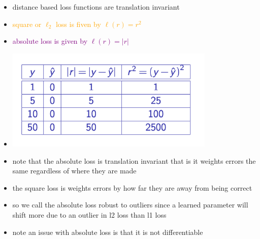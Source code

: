\documentclass{article}
\begin{document}
\begin{itemize}
\begin{enumerate}
\end{enumerate}
\item distance based loss functions are translation invariant 
\item \textcolor{orange}{square or $\ell_{2}$ loss is fiven by $\ell(r)=r^2$}
\item \textcolor{purple}{absolute loss is given by $\ell(r)=|r|$}
\item \includegraphics*[width=10cm]{images/Screenshot 2023-05-10 at 8.41.51 PM.png} 
\item note that the absolute loss is translation invariant that is it weights errors the same regardless of where they are made 
\item the square loss is weights errors by how far they are away from being correct 
\item so we call the absolute loss robust to outliers since a learned parameter will shift more due to an outlier in  l2 loss than l1 loss
\item note an issue with absolute loss is that it is not differentiable

\end{itemize}
\end{document}
